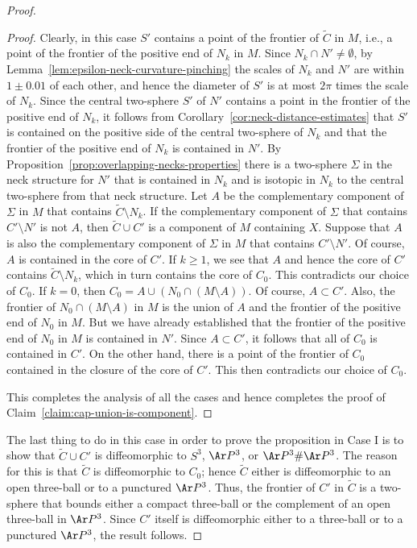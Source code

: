 \begin{proof}
\begin{proof}
 Clearly, in this case $S'$ contains a
point of the frontier of $\widetilde C$ in $M$, i.e., a point of the
frontier of the positive end of $N_k$ in $M$. Since $N_k\cap
N'\not=\emptyset$, by Lemma~\ref{lem:epsilon-neck-curvature-pinching} the scales of $N_k$ and
$N'$ are within $1\pm 0.01$ of each other, and hence the diameter of
$S'$ is at most $2\pi$ times the scale of $N_k$. Since the central
two-sphere $S'$ of $N'$ contains a point in the frontier of the
positive end of $N_k$, it follows from Corollary~\ref{cor:neck-distance-estimates} that $S'$
is contained on the positive side  of the central two-sphere of
$N_k$ and that the frontier of the positive end of $N_k$ is
contained in $N'$. By Proposition~\ref{prop:overlapping-necks-properties} there is a
two-sphere $\Sigma$ in the neck structure for $N'$ that is contained
in $N_k$ and is isotopic in $N_k$ to the central two-sphere from
that neck structure. Let $A$ be the complementary component of
$\Sigma$ in $M$ that contains $\widetilde C\setminus N_k$.
 If the complementary component of $\Sigma$ that contains
$C'\setminus N'$ is not $A$, then $\widetilde C\cup C'$ is a
component of $M$ containing $X$. Suppose that $A$ is also the
complementary component of $\Sigma$ in $M$ that contains
$C'\setminus N'$. Of course, $A$ is contained in the core of $C'$.
If $k\ge 1$, we see that $A$ and hence the core of $C'$ contains
$\widetilde C\setminus N_k$, which in turn contains the core of
$C_0$. This contradicts our choice of $C_0$. If $k=0$, then
$C_0=A\cup (N_0\cap (M\setminus A))$. Of course, $A\subset C'$.
Also, the frontier of $N_0\cap(M\setminus A)$ in $M$ is the union of
$A$ and the frontier of the positive end of $N_0$ in $M$. But we
have already established that the frontier of the positive end of
$N_0$ in $M$ is contained in $N'$. Since $A\subset C'$, it follows
that all of $C_0$ is contained in $C'$. On the other hand, there is
a point of the frontier of $C_0$ contained in the closure of the
core of $C'$. This then contradicts our choice of $C_0$.

 This
completes the analysis of all the cases and hence completes the
proof of Claim~\ref{claim:cap-union-is-component}.
\end{proof}

The last thing to do in this case in order to prove the proposition
in Case I is to show that $\widetilde C\cup C'$ is diffeomorphic to
$S^3$, $\Ar P^3$, or $\Ar P^3\#\Ar P^3$. The reason for this is that
$\widetilde C$ is diffeomorphic to $C_0$;  hence $\widetilde C$
either is diffeomorphic to an open three-ball or to a punctured $\Ar
P^3$. Thus, the frontier of $C'$ in $\widetilde C$ is a two-sphere
that bounds either a compact three-ball or the complement of an open
three-ball in $\Ar P^3$. Since $C'$ itself is diffeomorphic either
to a three-ball or to a punctured $\Ar P^3$, the result follows.


\end{proof}

